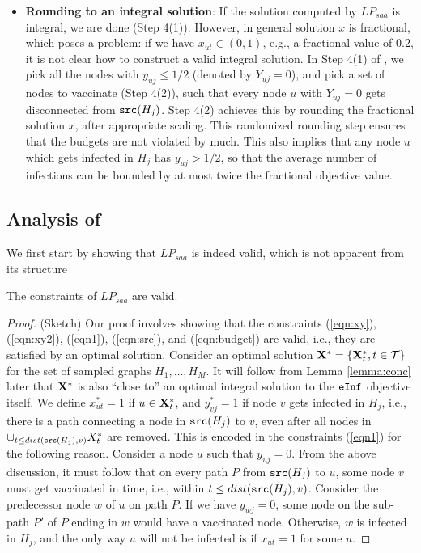 \begin{itemize}[leftmargin=0.1in, noitemsep, topsep=0pt]
\item
\textbf{Rounding to an integral solution}:
If the solution computed by $LP_{saa}$ is integral, we are done (Step 4(1)).
However, in general solution $x$ is fractional, which poses a problem:
if we have $x_{ut}\in(0, 1)$, e.g., a fractional value of $0.2$, it is not clear how to construct
a valid integral solution. In Step 4(1) of \algo{}, we pick all the nodes with $y_{uj}\leq 1/2$ (denoted by $Y_{uj}=0$),
and pick a set of nodes to vaccinate (Step 4(2)), such that every node $u$ with $Y_{uj}=0$ gets disconnected from $\texttt{src}(H_j)$.
Step 4(2) achieves this by rounding the fractional solution $x$, after appropriate scaling.
This randomized rounding step ensures that the budgets are not violated by much.
This also implies that any node $u$ which gets infected in $H_j$ has $y_{uj}>1/2$, so that the average number
of infections can be bounded by at most twice the fractional objective value.
\end{itemize}

\subsection{Analysis of \algo{}}

We first start by showing that $LP_{saa}$ is indeed valid, which is not apparent from its structure

\begin{lemma}
The constraints of $LP_{saa}$ are valid.
\end{lemma}
\begin{proof} (Sketch)
Our proof involves showing that the constraints (\ref{eqn:xy}), (\ref{eqn:xy2}), (\ref{eqn1}),
(\ref{eqn:src}), and (\ref{eqn:budget}) are valid, i.e., they are satisfied by an optimal solution.
Consider an optimal solution $\mathbf{X}^*=\{\mathbf{X}^*_t, t\in\mathcal{T}\}$ for the set of sampled graphs
$H_1,\ldots,H_M$. It will follow from Lemma \ref{lemma:conc} later that $\mathbf{X}^*$ is also ``close to''
an optimal integral solution to the $\texttt{eInf}$ objective itself.
We define $x^*_{ut}=1$ if $u\in\mathbf{X}^*_t$, and $y^*_{vj}=1$ if node $v$ gets infected in $H_j$, i.e.,
there is a path connecting a node in $\texttt{src}(H_j)$ to $v$, even after all nodes in $\cup_{t\leq dist(\texttt{src}(H_j), v)} X^*_t$ are 
removed.
This is encoded in the constraints (\ref{eqn1}) for the following reason. 
Consider a node $u$ such that $y_{uj}=0$. From the above discussion, it must follow that on every path $P$ from
$\texttt{src}(H_j)$ to $u$, some node $v$ must get vaccinated in time, i.e., within $t\leq dist(\texttt{src}(H_j), v)$.
Consider the predecessor node $w$ of $u$ on path $P$. If we have $y_{wj}=0$, some node on the sub-path $P'$ of $P$
ending in $w$ would have a vaccinated node. Otherwise, $w$ is infected in $H_j$, and the only way $u$ will not be
infected is if $x_{ut}=1$ for some $u$.
\end{proof}

